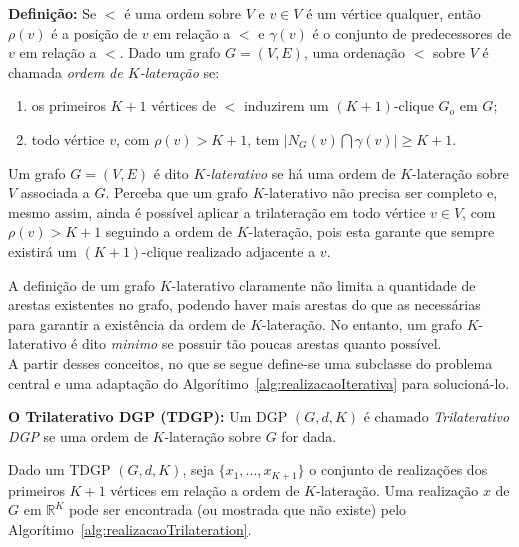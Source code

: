 \begin{center}
	\begin{minipage}{0.93 \linewidth}
		\textbf{Definição:} Se $<$ é uma ordem sobre $V$ e $v\in V$ é um vértice qualquer, então $\rho(v)$ é a posição de $v$ em relação a $<$ e $\gamma(v)$ é o conjunto de predecessores de $v$ em relação a $<$. Dado um grafo $G=(V,E)$, uma ordenação $<$ sobre $V$ é chamada \textit{ordem de $K$-lateração} se:
		\begin{enumerate}
			\vspace{-0.2cm}
			\item os primeiros $K+1$ vértices de $<$ induzirem um $(K+1)$-clique $G_o$ em $G$;
			\vspace{-0.2cm}
			\item todo vértice $v$, com $\rho(v) > K+1$, tem $\lvert N_G(v) \bigcap \gamma(v)\rvert \geq K+1$.
		\end{enumerate}
	\end{minipage}
\end{center}

Um grafo $G = (V,E)$ é dito \textit{$K$-laterativo} se há uma ordem de $K$-lateração sobre $V$ associada a $G$. Perceba que um grafo $K$-laterativo não precisa ser completo e, mesmo assim, ainda é possível aplicar a trilateração em todo vértice $v \in V$, com $\rho(v) >K+1$ seguindo a ordem de $K$-lateração, pois esta garante que sempre existirá um $(K+1)$-clique realizado adjacente a $v$.

A definição de um grafo $K$-laterativo claramente não limita a quantidade de arestas existentes no grafo, podendo haver mais arestas do que as necessárias para garantir a existência da ordem de $K$-lateração. No entanto, um grafo $K$-laterativo é dito \textit{minimo} se possuir tão poucas arestas quanto possível.
\\

A partir desses conceitos, no que se segue define-se uma subclasse do problema central e uma adaptação do Algorítimo~\ref{alg:realizacaoIterativa} para solucioná-lo.
\begin{center}
	\begin{minipage}{0.93 \linewidth}
		\textbf{O Trilaterativo DGP (TDGP):} Um DGP $(G,d,K)$ é chamado \textit{Trilaterativo DGP} se uma ordem de $K$-lateração sobre $G$ for dada.
	\end{minipage}
\end{center}

Dado um TDGP $(G,d,K)$, seja $\{x_1, \dots,x_{K+1}\}$ o conjunto de realizações dos primeiros $K+1$ vértices em relação a ordem de $K$-lateração. Uma realização $x$ de $G$ em $\mathbb{R}^K$ pode ser encontrada (ou mostrada que não existe) pelo Algorítimo~\ref{alg:realizacaoTrilateration}.
\\

